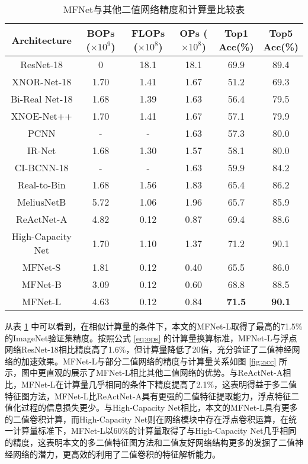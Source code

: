\begin{table}[htb]
  \vspace{6pt}
  \centering
  \caption{MFNet与其他二值网络精度和计算量比较表}
  \label{tab:45}
  \begin{tabular}{cccccc}
    \toprule
    Architecture & \makecell{BOPs \\($\times10^9$)} & \makecell{FLOPs\\($\times10^8$)} & \makecell{OPs\\($\times10^8$)} & \makecell{Top1 \\ Acc(\%)} & \makecell{Top5 \\ Acc(\%)} \\
    \midrule
    ResNet-18 \cite{resnet} & 0 & 18.1 & 18.1 & 69.9 & 89.4 \\
    \hline
    XNOR-Net-18 \cite{xnornet} & 1.70 & 1.41 & 1.67 & 51.2 & 69.3 \\ 
    Bi-Real Net-18 \cite{birealnet} & 1.68 & 1.39 & 1.63 & 56.4 & 79.5 \\ 
    XNOE-Net++ \cite{xnornet++} & 1.70 & 1.41 & 1.67 & 57.1 & 79.9 \\ 
    PCNN \cite{pcnn} & - & - & 1.63 & 57.3 & 80.0 \\ 
    IR-Net \cite{irnet} & 1.68 & 1.30 & 1.57 & 58.1 & 80.0 \\ 
    CI-BCNN-18 \cite{cibcnn} & - & - & 1.63 & 59.9 & 84.2 \\ 
    Real-to-Bin \cite{realtobin} & 1.68 & 1.56 & 1.83 & 65.4 & 86.2 \\ 
    MeliusNetB \cite{meliusnet} & 5.72 & 1.06 & 1.96 & 65.7 & 85.9 \\ 
    ReActNet-A \cite{reactnet} & 4.82 & 0.12 & 0.87 & 69.4 & 88.6 \\ 
    High-Capacity Net \cite{expert} & 1.70 & 1.10 & 1.37 & 71.2 & 90.1 \\ 
    MFNet-S  & 1.81 & 0.12 & 0.40 & 65.5 & 86.0 \\
    MFNet-B  & 3.09 & 0.12 & 0.60 & 68.8 & 88.5 \\
    MFNet-L  & 4.63 & 0.12 & 0.84 & \textbf{71.5} & \textbf{90.1} \\
    \bottomrule
  \end{tabular}
  \vspace{6pt}
\end{table}

从表 \ref{tab:45} 中可以看到，在相似计算量的条件下，本文的MFNet-L取得了最高的71.5\%的ImageNet验证集精度。按照公式 \eqref{eq:ops} 的计算量换算标准，MFNet-L与浮点网络ResNet-18相比精度高了1.6\%，但计算量降低了20倍，充分验证了二值神经网络的加速效果。MFNet-L与部分二值网络的精度与计算量关系如图 \ref{fig:acc} 所示，图中更直观的展示了MFNet-L相比其他二值网络的优势。与ReActNet-A相比，MFNet-L在计算量几乎相同的条件下精度提高了2.1\%，这表明得益于多二值特征图方法，MFNet-L比ReActNet-A具有更强的二值特征提取能力，浮点特征二值化过程的信息损失更少。与High-Capacity Net相比，本文的MFNet-L具有更多的二值卷积计算，而High-Capacity Net则在网络模块中存在浮点卷积运算，在统一计算量标准下，MFNet-L以60\%的计算量取得了与High-Capacity Net几乎相同的精度，这表明本文的多二值特征图方法和二值友好网络结构更多的发掘了二值神经网络的潜力，更高效的利用了二值卷积的特征解析能力。


